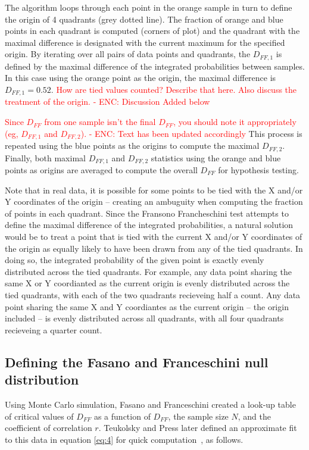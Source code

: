 \documentclass[codesnippet]{jss}
\newcommand{\RBnote}[1]{\textcolor{red}{#1}}
\begin{document}
The algorithm loops through each point in the orange sample in turn to define the origin of 4 quadrants (grey dotted line). The fraction of orange and blue points in each quadrant is computed (corners of plot) and the quadrant with the maximal difference is designated with the current maximum for the specified origin. By iterating over all pairs of data points and quadrants, the $D_{FF,1}$ is defined by the maximal difference of the integrated probabilities between samples. In this case using the orange point as the origin, the maximal difference is $D_{FF,1} = 0.52$.
\RBnote{How are tied values counted? Describe that here.  Also discuss the treatment of the origin. - ENC: Discussion Added below}

\RBnote{Since $D_{FF}$ from one sample isn't the final $D_{FF}$, you should note it appropriately (eg, $D_{FF,1}$ and $D_{FF,2}$). - ENC: Text has been updated accordingly}
This process is repeated using the blue points as the origins to compute the maximal $D_{FF,2}$. Finally, both maximal $D_{FF,1}$ and $D_{FF,2}$ statistics using the orange and blue points as origins are averaged to compute the overall $D_{FF}$ for hypothesis testing.

Note that in real data, it is possible for some points to be tied with the X and/or Y coordinates of the origin -- creating an ambuguity when computing the fraction of points in each quadrant. Since the Fransono Francheschini test attempts to define the maximal difference of the integrated probabilities, a natural solution would be to treat a point that is tied with the current X and/or Y coordinates of the origin as equally likely to have been drawn from any of the tied quadrants. In doing so, the integrated probability of the given point is exactly evenly distributed across the tied quadrants. For example, any data point sharing the same X or Y coordianted as the current origin is evenly distributed across the tied quadrants, with each of the two quadrants recieveing half a count. Any data point sharing the same X and Y coordiantes as the current origin  -- the origin included -- is evenly distributed across all quadrants, with all four quadrants recieveing a quarter count.

\subsection{Defining the Fasano and Franceschini null distribution}

Using Monte Carlo simulation, Fasano and Franceschini created a look-up table of critical values of $D_{FF}$ as a function of $D_{FF}$, the sample size $N$, and the coefficient of correlation $r$. Teukolsky and Press later defined an approximate fit to this data in equation \ref{eq:4} for quick computation~\cite{numericalRecipes}, as follows.
\end{document}
